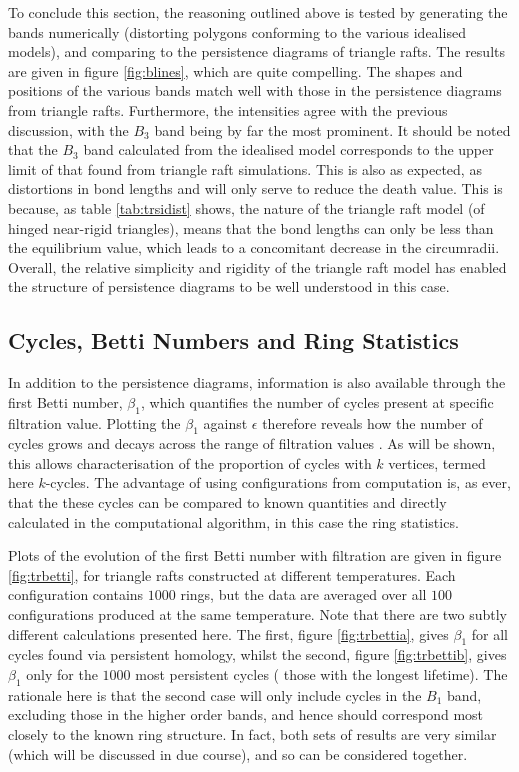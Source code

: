 To conclude this section, the reasoning outlined above is tested by generating the bands numerically (distorting polygons conforming to the various idealised models), and comparing to the persistence diagrams of triangle rafts. 
The results are given in figure \ref{fig:blines}, which are quite compelling.
The shapes and positions of the various bands match well with those in the persistence diagrams from triangle rafts.
Furthermore, the intensities agree with the previous discussion, with the $B_3$ band being by far the most prominent.
It should be noted that the $B_3$ band calculated from the idealised model corresponds to the upper limit of that found from triangle raft simulations.
This is also as expected, as distortions in bond lengths and will only serve to reduce the death value. 
This is because, as table \ref{tab:trsidist} shows, the nature of the triangle raft model (of hinged near\--rigid triangles), means that the bond lengths can only be less than the equilibrium value, which leads to a concomitant decrease in the circumradii.
Overall, the relative simplicity and rigidity of the triangle raft model has enabled the structure of persistence diagrams to be well understood in this \td{} case.

\subsection{Cycles, Betti Numbers and Ring Statistics}

In addition to the persistence diagrams, information is also available through the first Betti number, $\beta_1$, which quantifies the number of cycles present at specific filtration value.
Plotting the $\beta_1$ against $\epsilon$ therefore reveals how the number of cycles grows and decays across the range of filtration values \cite{Nakamura2015}.
As will be shown, this allows characterisation of the proportion of cycles with $k$ vertices, termed here $k$\--cycles.
The advantage of using configurations from computation is, as ever, that the these cycles can be compared to known quantities and directly calculated in the computational algorithm, in this case the ring statistics.

Plots of the evolution of the first Betti number with filtration are given in figure \ref{fig:trbetti}, for triangle rafts constructed at different temperatures.
Each configuration contains $1000$ rings, but the data are averaged over all $100$ configurations produced at the same temperature.
Note that there are two subtly different calculations presented here.
The first, figure \ref{fig:trbettia}, gives $\beta_1$ for all cycles found via persistent homology, whilst the second, figure \ref{fig:trbettib}, gives $\beta_1$ only for the $1000$ most persistent cycles (\ie{} those with the longest lifetime).
The rationale here is that the second case will only include cycles in the $B_1$ band, excluding those in the higher order bands, and hence should correspond most closely to the known ring structure.
In fact, both sets of results are very similar (which will be discussed in due course), and so can be considered together.

